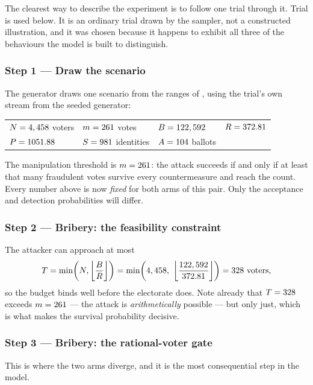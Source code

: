 The clearest way to describe the experiment is to follow one trial
through it. Trial \WEtrial{} is used below. It is an ordinary trial
drawn by the sampler, not a constructed illustration, and it was chosen
because it happens to exhibit all three of the behaviours the model is
built to distinguish.

\subsubsection*{Step 1 --- Draw the scenario}

The generator draws one scenario from the ranges of
, using the trial's own stream from the seeded
generator:

\begin{center}
\small
\begin{tabular}{@{}llll@{}}
\toprule
$N = 4,458$ voters & $m = 261$ votes & $B = 122,592$ & $R = 372.81$ \\
$P = 1051.88$ & $S = 981$ identities & $A = 104$ ballots & \\
\bottomrule
\end{tabular}
\end{center}

The manipulation threshold is $m = 261$: the attack succeeds if and
only if at least that many fraudulent votes survive every
countermeasure and reach the count. Every number above is now
\emph{fixed} for both arms of this pair. Only the acceptance and
detection probabilities will differ.

\subsubsection*{Step 2 --- Bribery: the feasibility constraint}

The attacker can approach at most
\[
T = \min\!\left(N, \left\lfloor \frac{B}{R} \right\rfloor\right)
  = \min\!\left(4,458,\ \left\lfloor \frac{122,592}{372.81} \right\rfloor\right)
  = 328 \text{ voters},
\]
so the budget binds well before the electorate does. Note already that
$T = 328$ exceeds $m = 261$ --- the attack is \emph{arithmetically}
possible --- but only just, which is what makes the survival
probability decisive.

\subsubsection*{Step 3 --- Bribery: the rational-voter gate}

This is where the two arms diverge, and it is the most consequential
step in the model.

